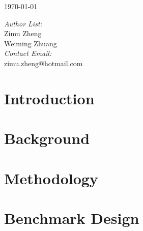 \documentclass{book}
\let\LaTeXStandardTableOfContents\tableofcontents
\renewcommand{\tableofcontents}{%
\begingroup%
\renewcommand{\bfseries}{\relax}%
\LaTeXStandardTableOfContents%
\endgroup%
}%
\begin{document}
\begin{titlepage}
\vspace{1.5cm}


{\large \today}\\[2cm] %


\vfill %

\end{titlepage}



\vspace{0.8cm}
\begin{minipage}{0.4\textwidth}
\begin{flushleft} \large
\Large \emph{Author List:}\\[0.1cm]
\Large Zimu Zheng\\
Weiming Zhuang\\
\vspace{0.8cm}
\Large \emph{Contact Email:}\\[0.1cm]
zimu.zheng@hotmail.com
\end{flushleft}
\end{minipage}


\tableofcontents



\chapter{Introduction}
\label{chap:intro}


\chapter{Background}
\label{chap:related}


\chapter{Methodology}
\label{chap:methodology}


\chapter{Benchmark Design}
\label{chap:work_plan}






\end{document}

